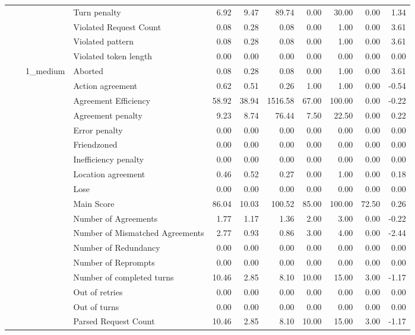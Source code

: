 \begin{tabular}{llllrrrrrrr}
 &  &  & Turn penalty & 6.92 & 9.47 & 89.74 & 0.00 & 30.00 & 0.00 & 1.34 \\
 &  &  & Violated Request Count & 0.08 & 0.28 & 0.08 & 0.00 & 1.00 & 0.00 & 3.61 \\
 &  &  & Violated pattern & 0.08 & 0.28 & 0.08 & 0.00 & 1.00 & 0.00 & 3.61 \\
 &  &  & Violated token length & 0.00 & 0.00 & 0.00 & 0.00 & 0.00 & 0.00 & 0.00 \\
\cline{3-11}
 &  & \multirow[t]{27}{*}{1_medium} & Aborted & 0.08 & 0.28 & 0.08 & 0.00 & 1.00 & 0.00 & 3.61 \\
 &  &  & Action agreement & 0.62 & 0.51 & 0.26 & 1.00 & 1.00 & 0.00 & -0.54 \\
 &  &  & Agreement Efficiency & 58.92 & 38.94 & 1516.58 & 67.00 & 100.00 & 0.00 & -0.22 \\
 &  &  & Agreement penalty & 9.23 & 8.74 & 76.44 & 7.50 & 22.50 & 0.00 & 0.22 \\
 &  &  & Error penalty & 0.00 & 0.00 & 0.00 & 0.00 & 0.00 & 0.00 & 0.00 \\
 &  &  & Friendzoned & 0.00 & 0.00 & 0.00 & 0.00 & 0.00 & 0.00 & 0.00 \\
 &  &  & Inefficiency penalty & 0.00 & 0.00 & 0.00 & 0.00 & 0.00 & 0.00 & 0.00 \\
 &  &  & Location agreement & 0.46 & 0.52 & 0.27 & 0.00 & 1.00 & 0.00 & 0.18 \\
 &  &  & Lose & 0.00 & 0.00 & 0.00 & 0.00 & 0.00 & 0.00 & 0.00 \\
 &  &  & Main Score & 86.04 & 10.03 & 100.52 & 85.00 & 100.00 & 72.50 & 0.26 \\
 &  &  & Number of Agreements & 1.77 & 1.17 & 1.36 & 2.00 & 3.00 & 0.00 & -0.22 \\
 &  &  & Number of Mismatched Agreements & 2.77 & 0.93 & 0.86 & 3.00 & 4.00 & 0.00 & -2.44 \\
 &  &  & Number of Redundancy & 0.00 & 0.00 & 0.00 & 0.00 & 0.00 & 0.00 & 0.00 \\
 &  &  & Number of Reprompts & 0.00 & 0.00 & 0.00 & 0.00 & 0.00 & 0.00 & 0.00 \\
 &  &  & Number of completed turns & 10.46 & 2.85 & 8.10 & 10.00 & 15.00 & 3.00 & -1.17 \\
 &  &  & Out of retries & 0.00 & 0.00 & 0.00 & 0.00 & 0.00 & 0.00 & 0.00 \\
 &  &  & Out of turns & 0.00 & 0.00 & 0.00 & 0.00 & 0.00 & 0.00 & 0.00 \\
 &  &  & Parsed Request Count & 10.46 & 2.85 & 8.10 & 10.00 & 15.00 & 3.00 & -1.17 \\

\end{tabular}
